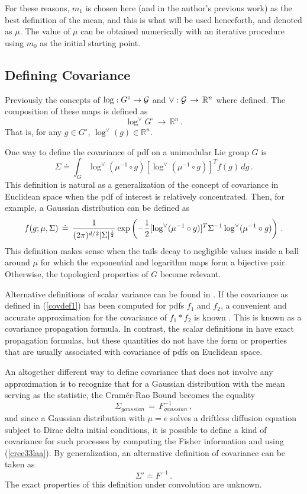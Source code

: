 \documentclass{svmult}
\def\half{ {1\over 2} }
\newcommand{\beq}{ \begin{equation}}
\newcommand{\eeq}{ \end{equation} }
\begin{document}
For these reasons, $m_1$ is chosen here (and in the author's previous work) as
the best definition of the mean, and this is what will be used henceforth, and
denoted as $\mu$. The value of $\mu$ can be obtained numerically with an iterative procedure using $m_0$ as the initial starting point.

\subsection{Defining Covariance}

Previously the concepts of $\log: G^{\circ} \rightarrow {\cal G}$ and $\vee:{\cal G} \,\rightarrow\, \mathbb{R}^n$ where defined. The composition of these maps is defined
as
$$ \log^{\vee} G^{\circ} \,\rightarrow\, \mathbb{R}^n\,. $$
That is, for any $g \in G^{\circ}$, $\log^{\vee}(g) \in \mathbb{R}^n$.

One way to define the covariance of pdf on a unimodular Lie group $G$ is \cite{wangprop1,wangprop2,vol2,dover}
\beq
\Sigma \doteq \int_{G} \log^{\vee}(\mu^{-1} \circ g) [\log^{\vee}(\mu^{-1} \circ g)]^T f(g)\, dg\,.
\label{covdef1}
\eeq
This definition is natural as a generalization of the concept of covariance in Euclidean space
when the pdf of interest is relatively concentrated. Then, for example, a Gaussian distribution
can be defined as
$$ f(g; \mu,\Sigma) \,\doteq\, \frac{1}{(2\pi)^{d/2}|\Sigma|^{\half}} \exp\left(-\half
[\log^{\vee}(\mu^{-1} \circ g)]^T \Sigma^{-1} \log^{\vee}(\mu^{-1} \circ g)\right)\,. $$
This definition makes sense when the tails decay to negligible values inside a ball around
$\mu$ for which the exponential and logarithm maps form a bijective pair. Otherwise, the topological properties of $G$ become relevant.

Alternative definitions of scalar variance can be found in \cite{vol2,Heyer,8Grenander}. If the covariance as defined in (\ref{covdef1}) has been computed for pdfs $f_1$ and $f_2$, a convenient and accurate approximation for the covariance of $f_1 * f_2$ is known \cite{wangprop2,dover}. This
is known as a covariance propagation formula.
In contrast, the scalar definitions in \cite{Heyer,8Grenander} have exact propagation formulas, but
these quantities do not have the form or properties that are usually associated with covariance
of pdfs on Euclidean space.

An altogether different way to define covariance that does not involve any approximation is to recognize that for a Gaussian distribution with the mean serving as the statistic, the Cram\'{e}r-Rao Bound becomes the equality
\begin{equation}
\Sigma_{gaussian} \,=\, F^{-1}_{gaussian}\,,
\label{cree33laa}
\end{equation}
and since a Gaussian distribution with $\mu = e$ solves a driftless diffusion equation subject
to Dirac delta initial conditions, it is possible to define a kind of covariance for such processes by computing the Fisher information and using (\ref{cree33laa}). By generalization, an alternative definition of covariance can be taken as
$$ \Sigma' \doteq F^{-1}\,. $$
The exact properties of this definition under convolution are unknown.
\end{document}
